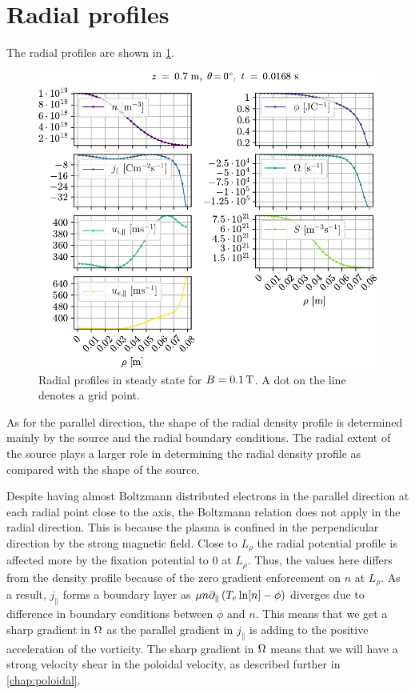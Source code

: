 \section{Radial profiles}
%
The radial profiles are shown in \cref{fig:radProfs}.
%
\begin{figure}[htb]
    \centering
    \includegraphics{fig/results/1DProfiles/B010Rad}
    \caption{Radial profiles in steady state for $B=0.1\, \text{T}$.
        A dot on the line denotes a grid point.
    }
    \label{fig:radProfs}
\end{figure}
%
As for the parallel direction, the shape of the radial density profile is determined mainly by the source and the radial boundary conditions.
The radial extent of the source plays a larger role in determining the radial density profile as compared with the shape of the source.

Despite having almost Boltzmann distributed electrons in the parallel direction at each radial point close to the axis, the Boltzmann relation does not apply in the radial direction.
This is because the plasma is confined in the perpendicular direction by the strong magnetic field.
Close to $L_\rho$ the radial potential profile is affected more by the fixation potential to $0$ at $L_\rho$.
Thus, the values here differs from the density profile because of the zero gradient enforcement on $n$ at $L_\rho$.
As a result, $j_\|$ forms a boundary layer as $\mu n \partial_\|\left(T_e\ln[n]-\phi\right)$ diverges due to difference in boundary conditions between $\phi$ and $n$.
This means that we get a sharp gradient in $\Omega$ as the parallel gradient in $j_\|$ is adding to the positive acceleration of the vorticity.
The sharp gradient in $\Omega$ means that we will have a strong velocity shear in the poloidal velocity, as described further in \cref{chap:poloidal}.
